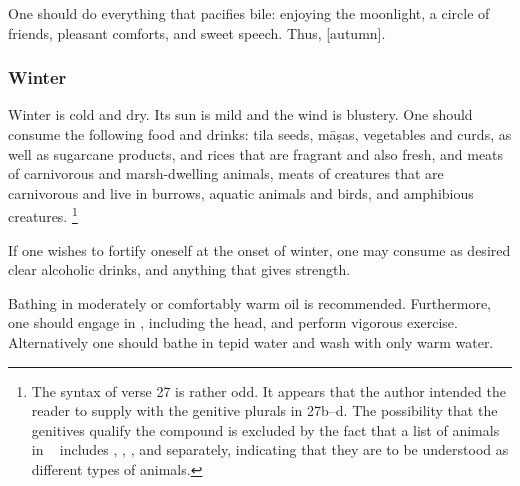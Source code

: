 \begin{translation}
\item[25] %
One should do everything that pacifies bile: enjoying the moonlight, a circle of friends, pleasant comforts, and sweet speech. Thus, [autumn].%

\subsubsection{Winter} %

\item[26--27] 
Winter is cold and dry. Its sun is mild and the wind is blustery. %
One should consume the following food and drinks: 
\gls{tila} seeds, 
\glspl{māṣa}, 
vegetables and curds, as well as 
sugarcane products, and 
rices that are fragrant and also fresh, %
%
and meats %
of carnivorous %
and marsh-dwelling animals, %
meats of
creatures that are 
carnivorous and live in burrows, %
aquatic animals and %
birds, %
and amphibious creatures.%
    \footnote{The syntax of verse 27 is rather odd. It appears that the author intended the reader to supply  with the genitive plurals in 27b–d. The possibility that the genitives qualify the compound  is excluded by the fact that a list of animals in  \SS\   includes , , , and  separately, indicating that they are to be understood as different types of animals.} %

\item[28] 
If one wishes to fortify oneself at the onset of winter, %
one may consume as desired %
clear alcoholic drinks, %
and anything that gives strength. %

\item[29] %
Bathing %
in moderately or comfortably warm  %
oil is recommended. %
Furthermore, %
one should engage in , including the head, and perform vigorous exercise.  Alternatively one should  bathe in tepid water and wash with only warm water. 


\end{translation}
